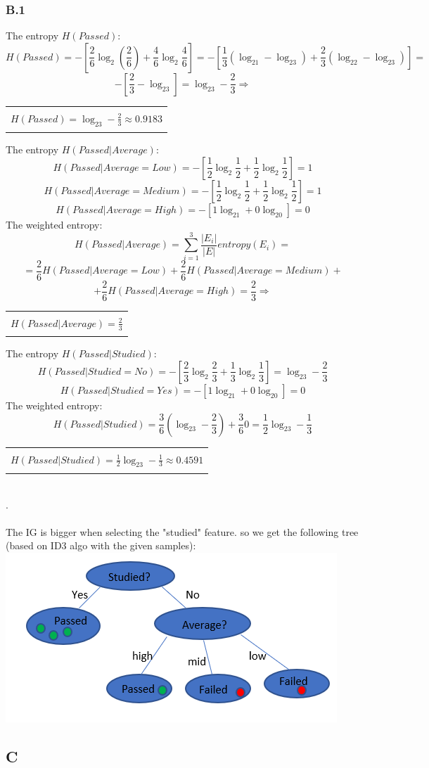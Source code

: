 \documentclass[12pt]{article}
\newcommand{\rectres}[1]{
\begin{center}
\begin{tabular}{ |c| }
\hline\\
#1\\
\\
\hline
\end{tabular}
\end{center}
}
\begin{document}
\subsubsection*{B.1}
The entropy $H(Passed)$:
$$H(Passed)= -[\frac{2}{6}\log_2(\frac{2}{6}) + \frac{4}{6}\log_2\frac{4}{6}] = -[\frac{1}{3}(\log_21- \log_23) + \frac{2}{3}(\log_22 - \log_23)]=$$ 
$$-[\frac{2}{3} - \log_23] = \log_23 - \frac{2}{3} \Rightarrow$$
\rectres{$H(Passed)=\log_23 - \frac{2}{3} \approx 0.9183$}
The entropy $H(Passed|Average)$:
$$H(Passed|Average=Low)= -[\frac{1}{2}\log_2\frac{1}{2} +\frac{1}{2}\log_2\frac{1}{2}] = 1$$ 
$$H(Passed|Average=Medium)= -[\frac{1}{2}\log_2\frac{1}{2} +\frac{1}{2}\log_2\frac{1}{2}] = 1$$ 
$$H(Passed|Average=High)= -[1\log_21 + 0\log_20] = 0$$ 
The weighted entropy:
$$H(Passed|Average)=\sum_{i=1}^3\frac{|E_i|}{|E|}entropy(E_i)=$$ $$=\frac{2}{6}H(Passed|Average=Low) + \frac{2}{6}H(Passed|Average=Medium)+$$
$$+\frac{2}{6}H(Passed|Average=High)=\frac{2}{3}\Rightarrow$$
\rectres{$H(Passed|Average)=\frac{2}{3}$}
The entropy $H(Passed|Studied)$:
$$H(Passed|Studied=No)= -[\frac{2}{3}\log_2\frac{2}{3} +\frac{1}{3}\log_2\frac{1}{3}] = \log_23 - \frac{2}{3}$$ 
$$H(Passed|Studied=Yes)= -[1\log_21 + 0\log_20] = 0$$ 
The weighted entropy:
$$H(Passed|Studied)=\frac{3}{6}(\log_23 - \frac{2}{3}) + \frac{3}{6}0= \frac{1}{2}\log_23 - \frac{1}{3}$$ 
\rectres{$H(Passed|Studied)=\frac{1}{2}\log_23 - \frac{1}{3} \approx 0.4591$}
\newpage\\
.\\
\\
The IG is bigger when selecting the "studied" feature. so we get the following tree (based on ID3 algo with the given samples):\\
\includegraphics[]{hw3/plots/tree.PNG}

\subsection*{C}
\end{document}
